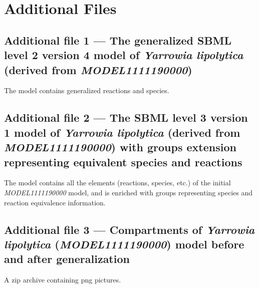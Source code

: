 \documentclass[9pt]{article}
\newcounter{rm}
\begin{document}
\section*{Additional Files}
  \subsection*{Additional file 1 --- The generalized SBML level 2 version 4 model of \textit{Yarrowia lipolytica} (derived from \emph{MODEL1111190000})}
    The model contains generalized reactions and species.
    
  \subsection*{Additional file 2 --- The SBML level 3 version 1 model of \textit{Yarrowia lipolytica} (derived from \emph{MODEL1111190000}) with groups extension representing equivalent species and reactions}
    The model contains all the elements (reactions, species, etc.) of the initial \emph{MODEL1111190000} model, and is enriched with groups representing species and reaction equivalence information.
    
    \subsection*{Additional file 3 --- Compartments of \textit{Yarrowia lipolytica} (\emph{MODEL1111190000}) model before and after generalization}
    A zip archive containing png pictures.
    
\end{document}
